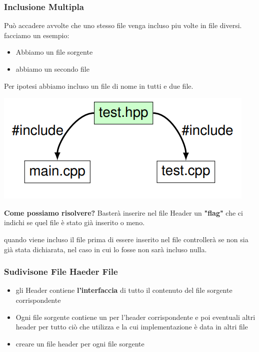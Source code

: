 \subsubsection{Inclusione Multipla}
Può accadere avvolte che uno stesso file  venga incluso piu volte in file diversi.
facciamo un esempio: 
\begin{itemize}
    \item Abbiamo un file sorgente 
    \item abbiamo un secondo file 
\end{itemize}
Per ipotesi abbiamo incluso un file di nome  in tutti e due file.\newline
\begin{center}
\includegraphics[scale = 0.6]{Capitoli/Compilatore/Esempi/esempioMultiplaInc.png}
\end{center}
\textbf{Come possiamo risolvere?} Basterà inserire nel file Header un \textbf{"flag"} che ci indichi se quel file è stato già inserito o meno.

quando viene incluso il file  prima di essere inserito nel file controllerà se  non sia già stata dichiarata, nel caso in cui lo fosse non sarà incluso nulla.

\subsubsection{Sudivisone File Haeder File}
\begin{itemize}
 \item gli Header contiene \textbf{l'interfaccia} di tutto il contenuto del file sorgente corrispondente 
 \item Ogni file sorgente contiene un  per l’header
    corrispondente e poi eventuali altri header per tutto ciò che
    utilizza e la cui implementazione è data in altri file
 \item creare un file header  per ogni file sorgente 
\end{itemize}


